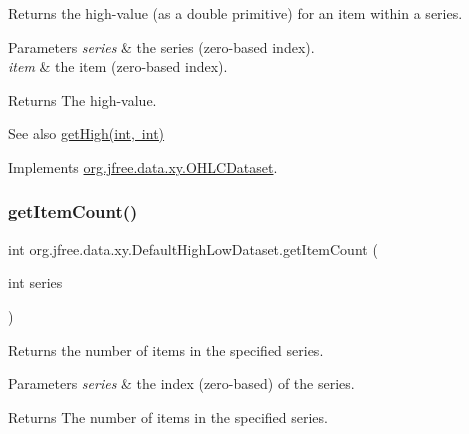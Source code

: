 Returns the high-\/value (as a double primitive) for an item within a series.


\begin{DoxyParams}{Parameters}
{\em series} & the series (zero-\/based index). \\
\hline
{\em item} & the item (zero-\/based index).\\
\hline
\end{DoxyParams}
\begin{DoxyReturn}{Returns}
The high-\/value.
\end{DoxyReturn}
\begin{DoxySeeAlso}{See also}
\mbox{\hyperlink{classorg_1_1jfree_1_1data_1_1xy_1_1_default_high_low_dataset_a3a49c92b4564fa5d6c9628b4395feaef}{get\+High(int, int)}} 
\end{DoxySeeAlso}


Implements \mbox{\hyperlink{interfaceorg_1_1jfree_1_1data_1_1xy_1_1_o_h_l_c_dataset_acd02ab8db72bebf0234954bd962365cb}{org.\+jfree.\+data.\+xy.\+O\+H\+L\+C\+Dataset}}.

\mbox{\label{classorg_1_1jfree_1_1data_1_1xy_1_1_default_high_low_dataset_af6ef60605755d26a4cd16fcb54f1a3e3}} 
\subsubsection{\texorpdfstring{get\+Item\+Count()}{getItemCount()}}
{\footnotesize\ttfamily int org.\+jfree.\+data.\+xy.\+Default\+High\+Low\+Dataset.\+get\+Item\+Count (\begin{DoxyParamCaption}\item[{int}]{series }\end{DoxyParamCaption})}

Returns the number of items in the specified series.


\begin{DoxyParams}{Parameters}
{\em series} & the index (zero-\/based) of the series.\\
\hline
\end{DoxyParams}
\begin{DoxyReturn}{Returns}
The number of items in the specified series. 
\end{DoxyReturn}



